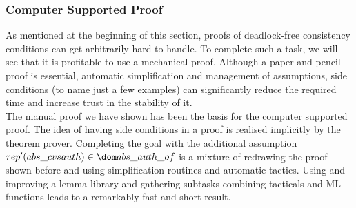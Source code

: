 \subsubsection{Computer Supported Proof}
%
%
As mentioned at the beginning of this section, proofs of deadlock-free
consistency conditions can get arbitrarily hard to handle. To complete such a
task, we will see that it is profitable to use a mechanical proof. Although a
paper and pencil proof is essential, automatic simplification and management of
assumptions, side conditions (to name just a few examples) can significantly
reduce the required time and
increase trust in the stability of it.\\
The manual proof we have shown has been the basis for the computer supported
proof. The idea of having side conditions in a proof is realised implicitly by
the theorem prover. Completing the goal with the additional assumption
$rep'(abs\_cvsauth) \in \dom abs\_auth\_of$ is a mixture of redrawing the proof
shown before and using simplification routines and automatic tactics. Using and
improving a lemma library and gathering subtasks combining tacticals and
ML-functions leads to a
remarkably fast and short result.\\

